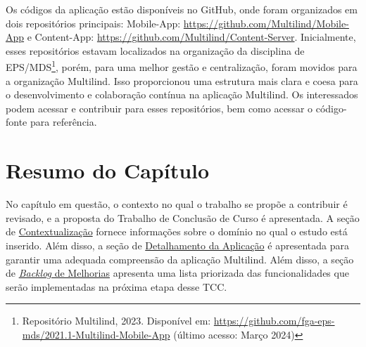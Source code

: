 Os códigos da aplicação estão disponíveis no GitHub, onde foram organizados em dois repositórios principais: Mobile-App: \url{https://github.com/Multilind/Mobile-App} e Content-App: \url{https://github.com/Multilind/Content-Server}. 
Inicialmente, esses repositórios estavam localizados na organização da disciplina de EPS/MDS\footnote{Repositório Multilind, 2023. Disponível em: \url{https://github.com/fga-eps-mds/2021.1-Multilind-Mobile-App} (último acesso: Março 2024)}, 
porém, para uma melhor gestão e centralização, foram movidos para a organização Multilind. Isso proporcionou uma estrutura mais clara e coesa para o desenvolvimento e colaboração contínua na aplicação Multilind. Os interessados 
podem acessar e contribuir para esses repositórios, bem como acessar o código-fonte para referência.

\section{Resumo do Capítulo}
\label{sec:Resumo Proposta}
No capítulo em questão, o contexto no qual o trabalho se propõe a contribuir é revisado, e a proposta do Trabalho de Conclusão de Curso é apresentada. A seção de \hyperref[sec:Contextualização]{Contextualização} fornece informações sobre o domínio no qual o estudo está inserido. Além disso, 
a seção de \hyperref[sec:Detalhamento da Aplicacao]{Detalhamento da Aplicação} é apresentada para garantir uma adequada compreensão da aplicação Multilind. Além disso, a seção de \hyperref[sec:Backlog de Melhorias]{\textit{Backlog} de Melhorias} apresenta uma lista priorizada das funcionalidades que serão implementadas na próxima etapa desse TCC. 
